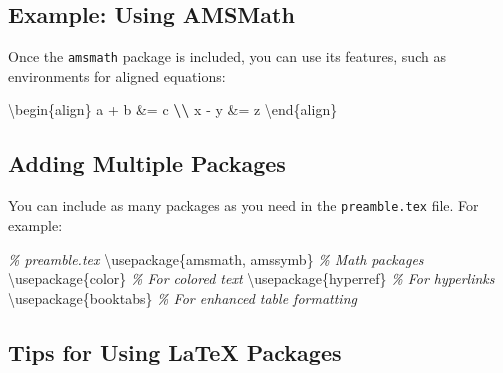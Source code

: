 \documentclass[
]{book}
\newenvironment{Shaded}{\begin{snugshade}}{\end{snugshade}}
\newcommand{\BuiltInTok}[1]{#1}
\newcommand{\CommentTok}[1]{\textcolor[rgb]{0.56,0.35,0.01}{\textit{#1}}}
\newcommand{\ExtensionTok}[1]{#1}
\newcommand{\NormalTok}[1]{#1}
\newcommand{\SpecialCharTok}[1]{\textcolor[rgb]{0.81,0.36,0.00}{\textbf{#1}}}
\theoremstyle{definition}
\theoremstyle{definition}
\theoremstyle{definition}
\theoremstyle{definition}
\theoremstyle{remark}
\begin{document}
\subsection{Example: Using AMSMath}\label{example-using-amsmath}

Once the \texttt{amsmath} package is included, you can use its features, such as environments for aligned equations:

\begin{Shaded}
\begin{Highlighting}[]
\NormalTok{\textbackslash{}begin\{align\}}
\NormalTok{  a + b \&= c }\SpecialCharTok{\textbackslash{}\textbackslash{}}
\NormalTok{  x {-} y \&= z}
\NormalTok{\textbackslash{}end\{align\}}
\end{Highlighting}
\end{Shaded}

\subsection{Adding Multiple Packages}\label{adding-multiple-packages}

You can include as many packages as you need in the \texttt{preamble.tex} file. For example:

\begin{Shaded}
\begin{Highlighting}[]
\CommentTok{\% preamble.tex}
\BuiltInTok{\textbackslash{}usepackage}\NormalTok{\{}\ExtensionTok{amsmath, amssymb}\NormalTok{\} }\CommentTok{\% Math packages}
\BuiltInTok{\textbackslash{}usepackage}\NormalTok{\{}\ExtensionTok{color}\NormalTok{\} }\CommentTok{\% For colored text}
\BuiltInTok{\textbackslash{}usepackage}\NormalTok{\{}\ExtensionTok{hyperref}\NormalTok{\} }\CommentTok{\% For hyperlinks}
\BuiltInTok{\textbackslash{}usepackage}\NormalTok{\{}\ExtensionTok{booktabs}\NormalTok{\} }\CommentTok{\% For enhanced table formatting}
\end{Highlighting}
\end{Shaded}

\subsection{Tips for Using LaTeX Packages}\label{tips-for-using-latex-packages}
\end{document}
